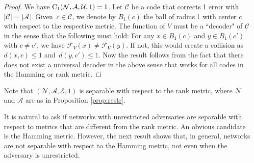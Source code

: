 \documentclass[11pt,a4paper]{article}
\theoremstyle{definition}
\newcommand{\mC}{\mathcal{C}}
\newcommand{\mA}{\mathcal{A}}
\newcommand{\mN}{\mathcal{N}}
\newcommand{\mF}{\mathcal{F}}
\newcommand{\mU}{\mathcal{U}}
\newcommand{\mE}{\mathcal{E}}
\newcommand{\CC}{\textnormal{C}}
\begin{document}
\begin{proof}
We have $\CC_1(\mN,\mA,\mU,1)=1$. Let $\mC$ be a code that corrects 1 error with $\lvert \mC \rvert=\lvert \mA \rvert$. Given~$c \in \mC$, we denote by $B_1(c)$
the ball of radius 1 with center $c$ with respect to the respective metric. The function of $V$ must be a ``decoder" of $\mC$ in the sense that the following must hold:
For any $x\in B_1(c)$ and $y\in B_1(c')$ with $c \neq c'$, we have $\mF_V(x) \neq \mF_V(y)$. If not, this would create a collision as $d(x,c) \le 1$ and~$d(y,c') \le 1$. Now the result follows from the fact that there does not exist a universal decoder in the above sense that works for all codes in the Hamming or rank metric. 
\end{proof}

Note that $(\mN,\mA,\mE,1)$ is separable with respect to the rank metric, where $\mN$ and $\mA$ are as in Proposition \ref{prop:restr}. 

It is natural to ask if networks with unrestricted adversaries are separable with respect to metrics that are different from the rank metric. An obvious candidate is the Hamming metric. However, the next result shows that, in general,
networks are not separable with respect to the Hamming metric, not even when the adversary is unrestricted.
\end{document}
